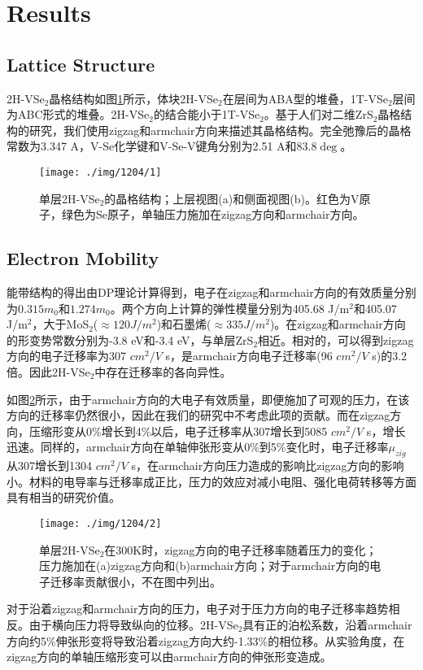 \documentclass[reprint, aps, prb, showkeys]{revtex4-2}
\begin{document}
\section{Results}
\subsection{Lattice Structure}
2H-VSe$_2$晶格结构如图\ref{fig:lattice}所示，体块2H-VSe$_2$在层间为ABA型的堆叠，1T-VSe$_2$层间为ABC形式的堆叠。2H-VSe$_2$的结合能小于1T-VSe$_2$。基于人们对二维ZrS$_2$晶格结构的研究，我们使用zigzag和armchair方向来描述其晶格结构。完全弛豫后的晶格常数为3.347 A，V-Se化学键和V-Se-V键角分别为2.51 A和83.8$\deg$。
\begin{figure}[t]
    \texttt{[image: ./img/1204/1]}
    \caption{\label{fig:lattice} 
    单层2H-VSe$_2$的晶格结构；上层视图(a)和侧面视图(b)。红色为V原子，绿色为Se原子，单轴压力施加在zigzag方向和armchair方向。
    }
\end{figure}
\subsection{Electron Mobility}
能带结构的得出由DP理论计算得到，电子在zigzag和armchair方向的有效质量分别为$0.315m_0$和$1.274m_0$。两个方向上计算的弹性模量分别为405.68 J/m$^2$和405.07 J/m$^2$，大于MoS$_2$($\approx 120 J/m^2$)和石墨烯($\approx 335 J/m^2$)。在zigzag和armchair方向的形变势常数分别为-3.8 eV和-3.4 eV，与单层ZrS$_2$相近。相对的，可以得到zigzag方向的电子迁移率为307 $cm^2/V$ s，是armchair方向电子迁移率(96 $cm^2/V$ s)的3.2倍。因此2H-VSe$_2$中存在迁移率的各向异性。

如图\ref{fig:mobility}所示，由于armchair方向的大电子有效质量，即便施加了可观的压力，在该方向的迁移率仍然很小，因此在我们的研究中不考虑此项的贡献。而在zigzag方向，压缩形变从0\%增长到4\%以后，电子迁移率从307增长到5085 $cm^2/V$ s，增长迅速。同样的，armchair方向在单轴伸张形变从0\%到5\%变化时，电子迁移率$\mu_{zig}$从307增长到1304 $cm^2/V$ s，在armchair方向压力造成的影响比zigzag方向的影响小。材料的电导率与迁移率成正比，压力的效应对减小电阻、强化电荷转移等方面具有相当的研究价值。
\begin{figure}[b]
    \texttt{[image: ./img/1204/2]}
    \caption{\label{fig:mobility} 
    单层2H-VSe$_2$在300K时，zigzag方向的电子迁移率随着压力的变化；压力施加在(a)zigzag方向和(b)armchair方向；对于armchair方向的电子迁移率贡献很小，不在图中列出。
    }
\end{figure}
对于沿着zigzag和armchair方向的压力，电子对于压力方向的电子迁移率趋势相反。由于横向压力将导致纵向的位移。2H-VSe$_2$具有正的泊松系数，沿着armchair方向约5\%伸张形变将导致沿着zigzag方向大约-1.33\%的相位移。从实验角度，在zigzag方向的单轴压缩形变可以由armchair方向的伸张形变造成。
\end{document}
